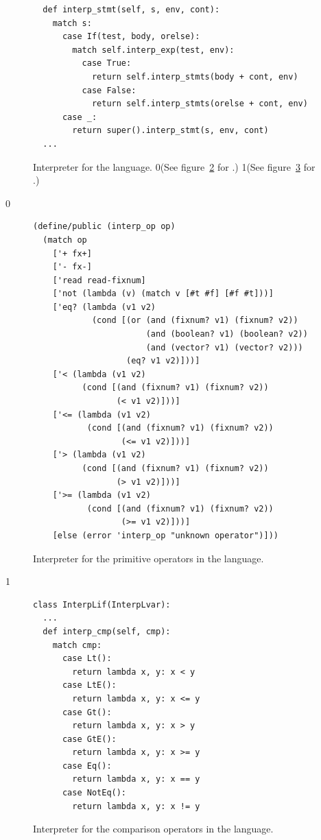 \documentclass[7x10]{TimesAPriori_MIT}%
\def\racketEd{0}
\def\pythonEd{1}
\providecommand{\BookEdition}{1}
\let\edition\BookEdition
\newcommand{\racket}[1]{{\if\edition\racketEd{#1}\fi}}
\newcommand{\pythonColor}[0]{}
\newcommand{\python}[1]{{\if\edition\pythonEd\pythonColor #1\fi}}
\numberwithin{theorem}{chapter}
\numberwithin{definition}{chapter}
\numberwithin{equation}{chapter}
\begin{document}
\begin{figure}[tbp]
\begin{tcolorbox}[colback=white]
{\begin{lstlisting}
  def interp_stmt(self, s, env, cont):
    match s:
      case If(test, body, orelse):
        match self.interp_exp(test, env):
          case True:
            return self.interp_stmts(body + cont, env)
          case False:
            return self.interp_stmts(orelse + cont, env)
      case _:
        return super().interp_stmt(s, env, cont)
  ...      
\end{lstlisting}
\fi}
\end{tcolorbox}
\caption{Interpreter for the \LangIf{} language. \racket{(See
    figure~\ref{fig:interp-op-Lif} for \code{interp-op}.)}
  \python{(See figure~\ref{fig:interp-cmp-Lif} for \code{interp\_cmp}.)}}
\label{fig:interp-Lif}
\end{figure}

{\if\edition\racketEd
\begin{figure}[tbp]
\begin{tcolorbox}[colback=white]    
\begin{lstlisting}
(define/public (interp_op op)
  (match op
    ['+ fx+]
    ['- fx-]
    ['read read-fixnum]
    ['not (lambda (v) (match v [#t #f] [#f #t]))]
    ['eq? (lambda (v1 v2)
            (cond [(or (and (fixnum? v1) (fixnum? v2))
                       (and (boolean? v1) (boolean? v2))
                       (and (vector? v1) (vector? v2)))
                   (eq? v1 v2)]))]
    ['< (lambda (v1 v2)
          (cond [(and (fixnum? v1) (fixnum? v2))
                 (< v1 v2)]))]
    ['<= (lambda (v1 v2)
           (cond [(and (fixnum? v1) (fixnum? v2))
                  (<= v1 v2)]))]
    ['> (lambda (v1 v2)
          (cond [(and (fixnum? v1) (fixnum? v2))
                 (> v1 v2)]))]
    ['>= (lambda (v1 v2)
           (cond [(and (fixnum? v1) (fixnum? v2))
                  (>= v1 v2)]))]
    [else (error 'interp_op "unknown operator")]))
\end{lstlisting}
\end{tcolorbox}

\caption{Interpreter for the primitive operators in the \LangIf{} language.}
\label{fig:interp-op-Lif}
\end{figure}
\fi}

{\if\edition\pythonEd\pythonColor
\begin{figure}
\begin{tcolorbox}[colback=white]
\begin{lstlisting}
class InterpLif(InterpLvar):
  ...
  def interp_cmp(self, cmp):
    match cmp:
      case Lt():
        return lambda x, y: x < y
      case LtE():
        return lambda x, y: x <= y
      case Gt():
        return lambda x, y: x > y
      case GtE():
        return lambda x, y: x >= y
      case Eq():
        return lambda x, y: x == y
      case NotEq():
        return lambda x, y: x != y
\end{lstlisting}
\end{tcolorbox}

\caption{Interpreter for the comparison operators in the \LangIf{} language.}
\label{fig:interp-cmp-Lif}
\end{figure}
\fi}
\end{document}

